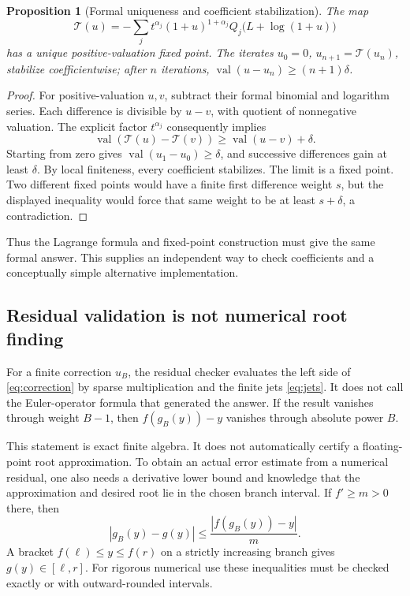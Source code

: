 \documentclass[11pt,a4paper]{article}
\newcommand{\val}{\operatorname{val}}
\newtheorem{proposition}[theorem]{Proposition}
\theoremstyle{definition}
\begin{document}
\begin{proposition}[Formal uniqueness and coefficient stabilization]
\label{prop:formal}
The map
\[
 \mathcal T(u)=-\sum_jt^{\alpha_j}(1+u)^{1+\alpha_j}
 Q_j\bigl(L+\log(1+u)\bigr)
\]
has a unique positive-valuation fixed point. The iterates \(u_0=0\),
\(u_{n+1}=\mathcal T(u_n)\), stabilize coefficientwise; after \(n\) iterations,
\(\val(u-u_n)\ge(n+1)\delta\).
\end{proposition}
\begin{proof}
For positive-valuation \(u,v\), subtract their formal binomial and logarithm
series. Each difference is divisible by \(u-v\), with quotient of
nonnegative valuation. The explicit factor \(t^{\alpha_j}\) consequently
implies
\[
 \val(\mathcal T(u)-\mathcal T(v))\ge\val(u-v)+\delta.
\]
Starting from zero gives \(\val(u_1-u_0)\ge\delta\), and successive
differences gain at least \(\delta\). By local finiteness, every coefficient
stabilizes. The limit is a fixed point. Two different fixed points would have
a finite first difference weight \(s\), but the displayed inequality would
force that same weight to be at least \(s+\delta\), a contradiction.
\end{proof}

Thus the Lagrange formula and fixed-point construction must give the same
formal answer. This supplies an independent way to check coefficients and a
conceptually simple alternative implementation.

\subsection{Residual validation is not numerical root finding}
For a finite correction \(u_B\), the residual checker evaluates the left side
of \eqref{eq:correction} by sparse multiplication and the finite jets
\eqref{eq:jets}. It does not call the Euler-operator formula that generated
the answer. If the result vanishes through weight \(B-1\), then
\(f(g_B(y))-y\) vanishes through absolute power \(B\).

This statement is exact finite algebra. It does not automatically certify a
floating-point root approximation. To obtain an actual error estimate from a
numerical residual, one also needs a derivative lower bound and knowledge
that the approximation and desired root lie in the chosen branch interval.
If \(f'\ge m>0\) there, then
\begin{equation}\label{eq:residual-bound}
 |g_B(y)-g(y)|\le\frac{|f(g_B(y))-y|}{m}.
\end{equation}
A bracket \(f(\ell)\le y\le f(r)\) on a strictly increasing branch gives
\(g(y)\in[\ell,r]\). For rigorous numerical use these inequalities must be
checked exactly or with outward-rounded intervals.
\end{document}
